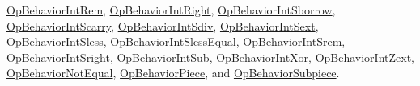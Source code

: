 \mbox{\hyperlink{class_op_behavior_int_rem}{Op\+Behavior\+Int\+Rem}}, \mbox{\hyperlink{class_op_behavior_int_right}{Op\+Behavior\+Int\+Right}}, \mbox{\hyperlink{class_op_behavior_int_sborrow}{Op\+Behavior\+Int\+Sborrow}}, \mbox{\hyperlink{class_op_behavior_int_scarry}{Op\+Behavior\+Int\+Scarry}}, \mbox{\hyperlink{class_op_behavior_int_sdiv}{Op\+Behavior\+Int\+Sdiv}}, \mbox{\hyperlink{class_op_behavior_int_sext}{Op\+Behavior\+Int\+Sext}}, \mbox{\hyperlink{class_op_behavior_int_sless}{Op\+Behavior\+Int\+Sless}}, \mbox{\hyperlink{class_op_behavior_int_sless_equal}{Op\+Behavior\+Int\+Sless\+Equal}}, \mbox{\hyperlink{class_op_behavior_int_srem}{Op\+Behavior\+Int\+Srem}}, \mbox{\hyperlink{class_op_behavior_int_sright}{Op\+Behavior\+Int\+Sright}}, \mbox{\hyperlink{class_op_behavior_int_sub}{Op\+Behavior\+Int\+Sub}}, \mbox{\hyperlink{class_op_behavior_int_xor}{Op\+Behavior\+Int\+Xor}}, \mbox{\hyperlink{class_op_behavior_int_zext}{Op\+Behavior\+Int\+Zext}}, \mbox{\hyperlink{class_op_behavior_not_equal}{Op\+Behavior\+Not\+Equal}}, \mbox{\hyperlink{class_op_behavior_piece}{Op\+Behavior\+Piece}}, and \mbox{\hyperlink{class_op_behavior_subpiece}{Op\+Behavior\+Subpiece}}.

